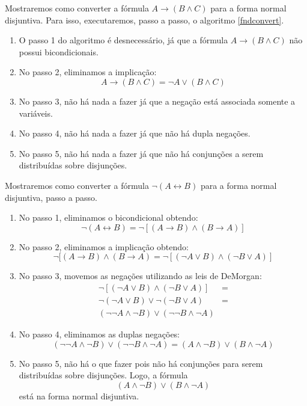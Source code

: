 \begin{Example}
Mostraremos como converter a fórmula $A\to (B\land C)$ para a forma
normal disjuntiva. Para isso, executaremos, passo a passo, o algoritmo
\ref{fndconvert}.
\begin{enumerate}
  \item O passo 1 do algoritmo é desnecessário, já que a fórmula $A
    \to (B\land C)$ não possui bicondicionais.
  \item No passo 2, eliminamos a implicação:
    \[A \to (B\land C) = \neg A \lor (B\land C)\]
  \item No passo 3, não há nada a fazer já que a negação está
    associada somente a variáveis.
   \item No passo 4, não há nada a fazer já que não há dupla negações.
   \item No passo 5, não há nada a fazer já que não há conjunções a
     serem distribuídas sobre disjunções.
\end{enumerate}
\end{Example}
\begin{Example}
Mostraremos como converter a fórmula $\neg (A\leftrightarrow B)$ para
a forma normal disjuntiva, passo a passo.
\begin{enumerate}
  \item No passo 1, eliminamos o bicondicional
    obtendo: \[\neg(A\leftrightarrow B) = \neg[(A \to
    B)\land (B\to A)]\]
  \item No passo 2, eliminamos a implicação obtendo:
   \[\neg[(A \to
    B)\land (B\to A)  = \neg[(\neg A \lor B) \land (\neg B \lor A)]\]
  \item No passo 3, movemos as negações utilizando as leis de
    DeMorgan:
   \[
       \begin{array}{lc}
         \neg[(\neg A \lor B) \land (\neg B \lor A)] & =\\
         \neg (\neg A \lor B) \lor \neg (\neg B \lor A) & = \\
         (\neg\neg A \land \neg B) \lor (\neg\neg B\land\neg A)
       \end{array}
   \]
   \item No passo 4, eliminamos as duplas negações:
  \[         (\neg\neg A \land \neg B) \lor (\neg\neg B\land\neg A) =
  (A \land \neg B) \lor (B\land\neg A)\]
  \item No passo 5, não há o que fazer pois não há conjunções para
    serem distribuídas sobre disjunções. Logo, a fórmula
   \[(A \land \neg B) \lor (B\land\neg A)\]
   está na forma normal disjuntiva.
\end{enumerate}
\end{Example}

